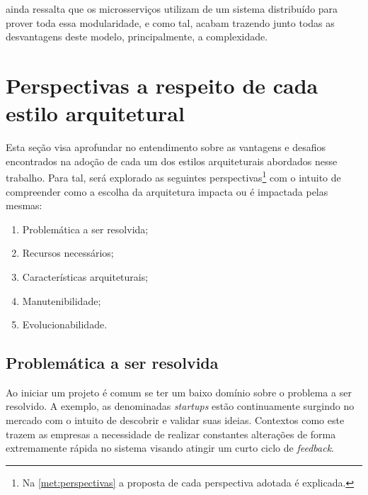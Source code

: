  ainda ressalta que os microsserviços utilizam de um sistema
distribuído para prover toda essa modularidade, e como tal, acabam trazendo junto todas as
desvantagens deste modelo, principalmente, a complexidade.


\section{Perspectivas a respeito de cada estilo arquitetural}
\label{perspectivas}

Esta seção visa aprofundar no entendimento sobre as vantagens e desafios encontrados na adoção
de cada um dos estilos arquiteturais abordados nesse trabalho. Para tal, será explorado as seguintes
perspectivas\footnote{Na \autoref{met:perspectivas} a proposta de cada perspectiva adotada é explicada.}
com o intuito de compreender como a escolha da arquitetura impacta ou é impactada pelas
mesmas:

\begin{enumerate}
    \item Problemática a ser resolvida;
    \item Recursos necessários;
    \item Características arquiteturais;
    \item Manutenibilidade;
    \item Evolucionabilidade.
\end{enumerate}

\subsection{Problemática a ser resolvida}
\label{Perspectivas:Problematica}

Ao iniciar um projeto é comum se ter um baixo domínio sobre o problema a ser resolvido. A exemplo,
as denominadas \textit{startups} estão continuamente surgindo no mercado com o intuito de descobrir
e validar suas ideias. Contextos como este trazem as empresas a necessidade de realizar constantes
alterações de forma extremamente rápida no sistema visando atingir um curto ciclo de
\textit{feedback}.

